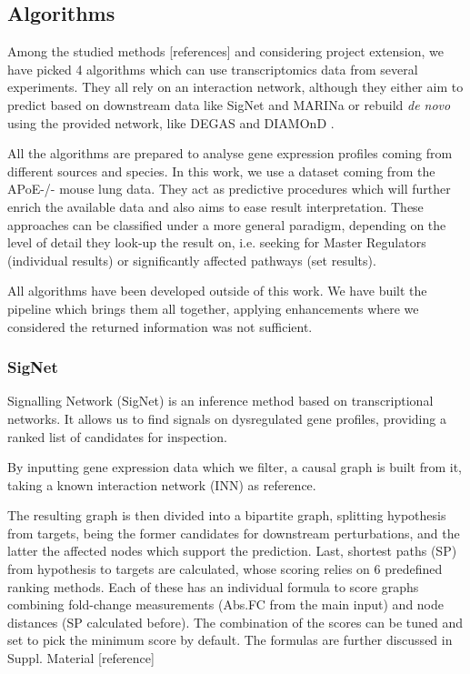 \subsection{Algorithms}
Among the studied methods [references] and considering project extension, we have picked 4 algorithms which can use transcriptomics data from several experiments. They all rely on an interaction network, although they either aim to predict based on downstream data like SigNet \cite{Coker2017SiGNet:Inference} and MARINa \cite{Lefebvre2010ACenters}  or rebuild \textit{de novo} using the provided network, like DEGAS \cite{Ulitsky2010DEGAS:Diseases} and DIAMOnD \cite{Ghiassian2015AInteractome}.

All the algorithms are prepared to analyse gene expression profiles coming from different sources and species. In this work, we use a dataset coming from the APoE-/- \cite{LoSasso2016TheReduction} mouse lung data. They act as predictive procedures which will further enrich the available data and also aims to ease result interpretation. These approaches can be classified under a more general paradigm, depending on the  level of detail they look-up the result on, i.e. seeking for Master Regulators (individual results) or significantly affected pathways \cite{Faust2010PathwayExtraction} (set results).


All algorithms have been developed outside of this work. We have built the pipeline which brings them all together, applying enhancements where we considered the returned information was not sufficient.


\subsubsection{SigNet}
Signalling Network (SigNet) \cite{Coker2017SiGNet:Inference} is an inference method based on transcriptional networks. It allows us to find signals on dysregulated gene profiles, providing a ranked list of candidates for inspection. 


By inputting gene expression data which we filter, a causal graph is built from it, taking a known interaction network (INN) as reference.


The resulting graph is then divided into a bipartite graph, splitting hypothesis from targets, being the former candidates for downstream perturbations, and the latter the affected nodes which support the prediction. Last, shortest paths (SP) from hypothesis to targets are calculated, whose scoring relies on 6 predefined ranking methods. Each of these has an individual formula to score graphs combining fold-change measurements (Abs.FC from the main input) and node distances (SP calculated before). The combination of the scores can be tuned and set to pick the minimum score by default. The formulas are further discussed in Suppl. Material [reference]


